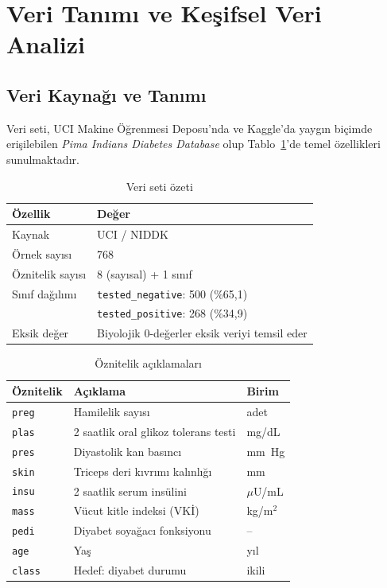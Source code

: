 \documentclass[12pt,a4paper]{article}
\begin{document}
\section{Veri Tanımı ve Keşifsel Veri Analizi}

\subsection{Veri Kaynağı ve Tanımı}

Veri seti, UCI Makine Öğrenmesi Deposu'nda ve Kaggle'da yaygın biçimde
erişilebilen \textit{Pima Indians Diabetes Database} olup
Tablo~\ref{tab:dataset}'de temel özellikleri sunulmaktadır.

\begin{table}[H]
\centering
\caption{Veri seti özeti}
\label{tab:dataset}
\begin{tabular}{@{}ll@{}}
\toprule
\textbf{Özellik} & \textbf{Değer} \\
\midrule
Kaynak & UCI / NIDDK \\
Örnek sayısı & 768 \\
Öznitelik sayısı & 8 (sayısal) + 1 sınıf \\
Sınıf dağılımı & \texttt{tested\_negative}: 500 (\%65{,}1) \\
               & \texttt{tested\_positive}: 268 (\%34{,}9) \\
Eksik değer & Biyolojik 0-değerler eksik veriyi temsil eder \\
\bottomrule
\end{tabular}
\end{table}

\begin{table}[H]
\centering
\caption{Öznitelik açıklamaları}
\label{tab:features}
\begin{tabular}{@{}lll@{}}
\toprule
\textbf{Öznitelik} & \textbf{Açıklama} & \textbf{Birim} \\
\midrule
\texttt{preg}  & Hamilelik sayısı                        & adet \\
\texttt{plas}  & 2 saatlik oral glikoz tolerans testi    & mg/dL \\
\texttt{pres}  & Diyastolik kan basıncı                  & mm~Hg \\
\texttt{skin}  & Triceps deri kıvrımı kalınlığı          & mm \\
\texttt{insu}  & 2 saatlik serum insülini                & $\mu$U/mL \\
\texttt{mass}  & Vücut kitle indeksi (VKİ)               & kg/m$^{2}$ \\
\texttt{pedi}  & Diyabet soyağacı fonksiyonu             & -- \\
\texttt{age}   & Yaş                                     & yıl \\
\texttt{class} & Hedef: diyabet durumu                   & ikili \\
\bottomrule
\end{tabular}
\end{table}
\end{document}
